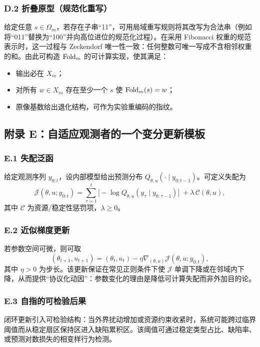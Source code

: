 \subsubsection{D.2 折叠原型（规范化重写）}

给定任意 $s\in\Omega_m$，若存在子串“11”，可用局域重写规则将其改写为合法串（例如将“011”替换为“100”并向高位进位的规范化过程）。在采用 Fibonacci 权重的规范表示时，这一过程与 Zeckendorf 唯一性一致：任何整数可唯一写成不含相邻权重的和。由此可构造 $\mathrm{Fold}_m$ 的可计算实现，使其满足：
\begin{itemize}
  \item 输出必在 $X_m$；
  \item 对所有 $w\in X_m$ 存在至少一个 $s$ 使 $\mathrm{Fold}_m(s)=w$；
  \item 原像基数给出退化结构，可作为实验重编码的指纹。
\end{itemize}

\subsection{附录 E：自适应观测者的一个变分更新模板}

\subsubsection{E.1 失配泛函}

给定观测序列 $y_{0:t}$，设内部模型给出预测分布 $Q_{\theta,u}(\cdot\mid y_{0:t-1})$。可定义失配为
\[
\mathcal{J}(\theta,u;y_{0:t})
=
\sum_{\tau=1}^{t} \Big[-\log Q_{\theta,u}(y_{\tau}\mid y_{0:\tau-1})\Big]
\;+\lambda\,\mathcal{C}(\theta,u),
\]
其中 $\mathcal{C}$ 为资源/稳定性惩罚项，$\lambda\ge0$。

\subsubsection{E.2 近似梯度更新}

若参数空间可微，则可取
\[
(\theta_{t+1},u_{t+1})
=
(\theta_t,u_t) - \eta \nabla_{(\theta,u)} \mathcal{J}(\theta,u;y_{0:t}),
\]
其中 $\eta>0$ 为步长。该更新保证在常见正则条件下使 $\mathcal{J}$ 单调下降或在邻域内下降，从而提供“协议化动因”：参数变化的理由是降低可计算失配而非外加目的论。

\subsubsection{E.3 自指的可检验后果}

闭环更新引入可检验结构：当外界扰动增加或资源约束收紧时，系统可能跨过临界阈值而从稳定扇区保持区进入缺陷累积区。该阈值可通过稳定类型占比、缺陷率、或预测对数损失的相变样行为检测。

